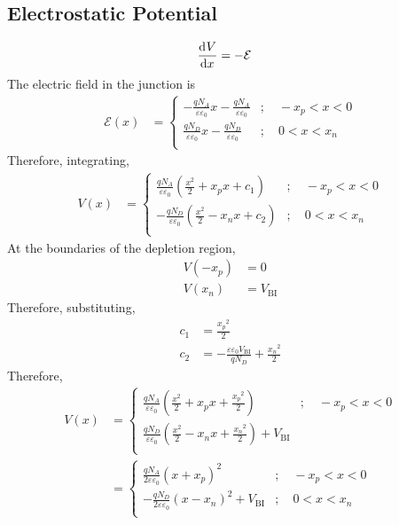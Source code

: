 \documentclass[titlepage, fleqn, a4paper, 12pt, twoside]{article}
\theoremstyle{definition}
\theoremstyle{theorem}
\begin{document}
\subsection{Electrostatic Potential}

\begin{align*}
	\dod{V}{x} &= -\mathcal{E}
\end{align*}
The electric field in the junction is
\begin{align*}
	\mathcal{E}(x) &=
		\begin{cases}
			-\frac{q N_A}{\varepsilon \varepsilon_0} x - \frac{q N_A}{\varepsilon \varepsilon_0} & ;\quad -x_p < x < 0 \\
			\frac{q N_D}{\varepsilon \varepsilon_0} x - \frac{q N_D}{\varepsilon \varepsilon_0}  & ;\quad 0 < x < x_n  \\
		\end{cases}
\end{align*}
Therefore, integrating,
\begin{align*}
	V(x) &=
		\begin{cases}
			\frac{q N_A}{\varepsilon \varepsilon_0} \left( \frac{x^2}{2} + x_p x + c_1 \right)  & ;\quad -x_p < x < 0 \\
			-\frac{q N_D}{\varepsilon \varepsilon_0} \left( \frac{x^2}{2} - x_n x + c_2 \right) & ;\quad 0 < x < x_n  \\
		\end{cases}
\end{align*}
At the boundaries of the depletion region,
\begin{align*}
	V(-x_p) & = 0 \\
	V(x_n)  & = V_{\text{BI}}
\end{align*}
Therefore, substituting,
\begin{align*}
	c_1 & = \frac{{x_p}^2}{2} \\
	c_2 & = -\frac{\varepsilon \varepsilon_0 V_{\text{BI}}}{q N_D} + \frac{{x_n}^2}{2}
\end{align*}
Therefore,
\begin{align*}
	V(x) &=
		\begin{cases}
			\frac{q N_A}{\varepsilon \varepsilon_0} \left( \frac{x^2}{2} + x_p x + \frac{{x_p}^2}{2} \right)                  & ;\quad -x_p < x < 0 \\
			\frac{q N_D}{\varepsilon \varepsilon_0} \left( \frac{x^2}{2} - x_n x + \frac{{x_n}^2}{2} \right) + V_{\text{BI}} \\
		\end{cases}\\
	&=
		\begin{cases}
			\frac{q N_A}{2 \varepsilon \varepsilon_0} (x + x_p)^2                  & ;\quad -x_p < x < 0 \\
			-\frac{q N_D}{2 \varepsilon \varepsilon_0} (x - x_n)^2 + V_{\text{BI}} & ;\quad 0 < x < x_n  \\
		\end{cases}
\end{align*}
\end{document}
